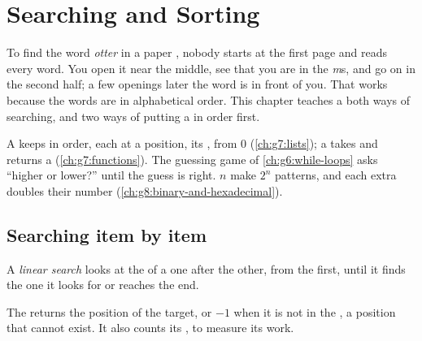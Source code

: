 \chapter{Searching and Sorting}\label{ch:g8:searching-and-sorting}

To find the word \emph{otter} in a paper , nobody starts at the
first page and reads every word. You open it near the middle, see that you
are in the \emph{m}s, and go on in the second half; a few openings later the
word is in front of you. That works because the words are in alphabetical
order. This chapter teaches a  both ways of searching, and two ways
of putting a  in order first.

\begin{recall}
A  keeps  in order, each at a position, its , from 0
(\cref{ch:g7:lists}); a  takes  and returns a 
(\cref{ch:g7:functions}). The guessing game of \cref{ch:g6:while-loops} asks
``higher or lower?'' until the guess is right. $n$  make $2^n$ patterns,
and each extra  doubles their number (\cref{ch:g8:binary-and-hexadecimal}).
\end{recall}

\section{Searching item by item}

\begin{definition}\label{def:g8:searching-and-sorting:linear-search}
A \emph{linear search} looks at the  of a  one
after the other, from the first, until it finds the one it looks for or
reaches the end.
\end{definition}

The  returns the position of the target, or $-1$ when it is not in
the , a position that cannot exist. It also counts its , to
measure its work.

